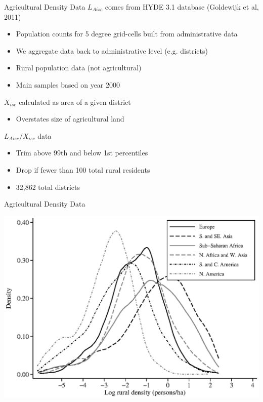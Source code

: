 \documentclass[10pt, xcolor=dvipsnames]{beamer}
\begin{document}
\begin{frame}{Agricultural Density Data}
$L_{Aisc}$ comes from HYDE 3.1 database (Goldewijk et al, 2011)
\begin{itemize}
  \item Population counts for 5 degree grid-cells built from administrative data
  \item We aggregate data back to administrative level (e.g. districts)
  \item Rural population data (not agricultural)
  \item Main samples based on year 2000
\end{itemize}
$X_{isc}$ calculated as area of a given district
\begin{itemize}
  \item Overstates size of agricultural land
\end{itemize}
$L_{Aisc}/X_{isc}$ data 
\begin{itemize}
  \item Trim above 99th and below 1st percentiles
  \item Drop if fewer than 100 total rural residents
  \item 32,862 total districts
\end{itemize}
\end{frame}

\begin{frame}{Agricultural Density Data}
\begin{center}
\includegraphics[width=.8\textwidth]{fig_dens_rurd.eps}
\end{center}
\end{frame}
\end{document}
